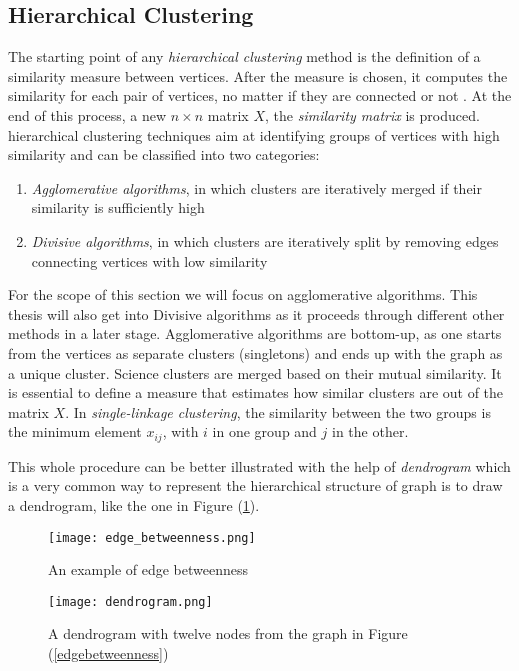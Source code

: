 \subsection{Hierarchical Clustering}\label{sub:hierarchicalclustering}
The starting point of any \textit{hierarchical clustering} method is the definition of a similarity measure between vertices. After the measure is chosen, it computes the similarity for each pair of vertices, no matter if they are connected or not \cite{ref-6}. At the end of this process, a new $ n \times n$ matrix $X$, the \textit{similarity matrix} is produced. hierarchical clustering techniques aim at identifying groups of vertices with high similarity and can be classified into two categories:

\begin{enumerate}
	\item \textit{Agglomerative algorithms}, in which clusters are iteratively merged if their similarity is sufficiently high
	\item \textit{Divisive algorithms}, in which clusters are iteratively split by removing edges connecting vertices with low similarity
\end{enumerate}

For the scope of this section we will focus on agglomerative algorithms. This thesis will also get into Divisive algorithms as it proceeds through different other methods in a later stage. Agglomerative algorithms are bottom-up, as one starts from the vertices as separate clusters (singletons) and ends up with the graph as a unique cluster. Science clusters are merged based on their mutual similarity. It is essential to define a measure that estimates how similar clusters are out of the matrix $X$. In \textit{single-linkage clustering}, the similarity between the two groups is the minimum element $x_{ij}$, with $i$ in one group and $j$ in the other.

This whole procedure can be better illustrated with the help of \textit{dendrogram} which is a very common way to represent the hierarchical structure of graph is to draw a dendrogram, like the one in Figure (\ref{dendrogram}).

\begin{figure}[H]
	\centering
	\begin{minipage}[b]{0.5\textwidth}
		\centering
		\texttt{[image: edge\_betweenness.png]}
		\caption{An example of edge betweenness}
		\label{edgebetweenness}
	\end{minipage}
	\begin{minipage}[b]{0.45\textwidth}
		\centering
		\texttt{[image: dendrogram.png]}
		\caption{A dendrogram with twelve nodes from the graph in Figure (\ref{edgebetweenness})}
		\label{dendrogram}
	\end{minipage}
\end{figure}

